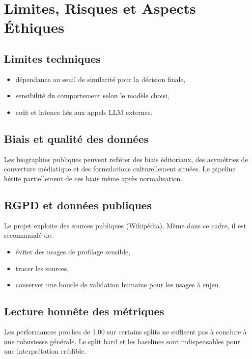 \chapter{Limites, Risques et Aspects Éthiques}

\section{Limites techniques}
\begin{itemize}[leftmargin=2em]
  \item dépendance au seuil de similarité pour la décision finale,
  \item sensibilité du comportement selon le modèle choisi,
  \item coût et latence liés aux appels LLM externes.
\end{itemize}

\section{Biais et qualité des données}
Les biographies publiques peuvent refléter des biais éditoriaux, des asymétries de couverture médiatique et des formulations culturellement situées. Le pipeline hérite partiellement de ces biais même après normalisation.

\section{RGPD et données publiques}
Le projet exploite des sources publiques (Wikipédia). Même dans ce cadre, il est recommandé de:
\begin{itemize}[leftmargin=2em]
  \item éviter des usages de profilage sensible,
  \item tracer les sources,
  \item conserver une boucle de validation humaine pour les usages à enjeu.
\end{itemize}

\section{Lecture honnête des métriques}
Les performances proches de 1.00 sur certains splits ne suffisent pas à conclure à une robustesse générale. Le split hard et les baselines sont indispensables pour une interprétation crédible.

